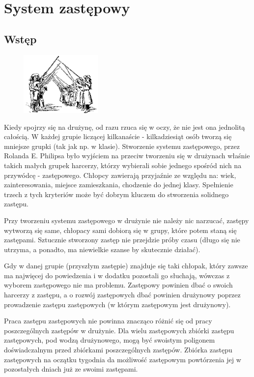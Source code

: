 \chapter{System zastępowy}
\section{Wstęp}
\begin{figure}
  \begin{center}
    \includegraphics[width=4cm]{grafiki/szpaler.png}
  \end{center}
\end{figure}Kiedy  spojrzy się na  drużynę, od  razu rzuca  się w  oczy,  że nie jest ona jednolitą całością. 
W każdej grupie liczącej kilkanaście - kilkadziesiąt osób tworzą się  mniejsze  grupki (tak jak np. w  klasie). 
Stworzenie systemu zastępowego, przez Rolanda E. Philipsa było wyjściem na przeciw tworzeniu  się w drużynach właśnie takich małych grupek harcerzy, którzy wybierali sobie jednego spośród nich na przywódcę - zastępowego. 
Chłopcy zawierają  przyjaźnie  ze względu na: wiek, zainteresowania,  miejsce  zamieszkania, chodzenie do jednej klasy. Spełnienie trzech z tych kryteriów może być dobrym kluczem  do stworzenia  solidnego zastępu. 
	
Przy tworzeniu systemu zastępowego w drużynie nie należy nic narzucać, zastępy wytworzą się same, chłopacy sami dobiorą się w grupy, które potem staną  się zastępami. Sztucznie stworzony zastęp nie przejdzie próby czasu (długo się nie utrzyma, a ponadto, ma niewielkie szanse by skutecznie działać).

Gdy w danej grupie (przyszłym  zastępie)  znajduje  się  taki chłopak, który  zawsze ma najwięcej do powiedzenia  i  w  dodatku  pozostali  go  słuchają, wówczas z wyborem zastępowego nie ma problemu. 
Zastępowy powinien dbać o swoich harcerzy z zastępu,  a o rozwój zastępowych dbać powinien drużynowy poprzez prowadzenie zastępu zastępowych (w którym zastępowym jest drużynowy).

Praca zastępu zastępowych  nie powinna znacząco różnić się od pracy poszczególnych zastępów  w  drużynie. Dla wielu zastępowych zbiórki zastępu zastępowych, pod wodzą  drużynowego, mogą być swoistym poligonem doświadczalnym przed zbiórkami  poszczególnych zastępów. Zbiórka zastępu zastępowych na  oczątku tygodnia da możliwość zastępowym powtórzenia jej w  pozostałych dniach już ze  swoimi  zastępami.

